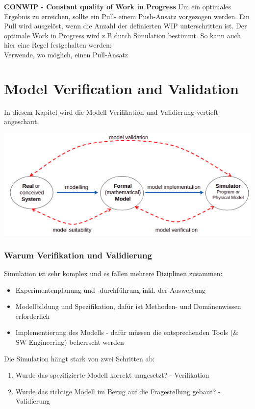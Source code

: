 \textbf{CONWIP - Constant quality of Work in Progress }
\newline
Um ein optimales Ergebnis zu erreichen, sollte ein Pull- einem Push-Ansatz vorgezogen werden.
Ein Pull wird ausgelöst, wenn die Anzahl der definierten WIP unterschritten ist.
Der optimale Work in Progress wird z.B durch Simulation bestimmt. So kann auch hier eine Regel festgehalten werden: \\
\newline
Verwende, wo möglich, einen Pull-Ansatz
\newline

\section{Model Verification and Validation  }
In diesem Kapitel wird die Modell Verifikation und Validierung vertieft angeschaut.

\begin{minipage}[t]{0.9\textwidth}
\centering
\includegraphics[width=0.9\linewidth]{images/simulationsphasen.png}
\end{minipage}

\subsubsection{Warum Verifikation und Validierung}
Simulation ist sehr komplex und es fallen mehrere Diziplinen zusammen: 
\begin{itemize}
    \item Experimentenplanung und -durchführung inkl. der Auswertung
    \item Modellbildung und Spezifikation, dafür ist Methoden- und Domänenwissen erforderlich
    \item Implementierung des Modells - dafür müssen die entsprechenden Tools (\& SW-Engineering) beherrscht werden
\end{itemize}

Die Simulation hängt stark von zwei Schritten ab:
\begin{enumerate}
    \item Wurde das spezifizierte Modell korrekt umgesetzt? - Verifikation 
    \item Wurde das richtige Modell im Bezug auf die Fragestellung gebaut? - Validierung  
\end{enumerate}

